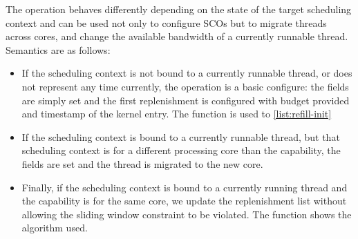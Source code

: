 The  operation behaves differently depending on the state of the target scheduling
context and can be used not only to configure \glspl{SCO} but to migrate threads across cores, and
change the available bandwidth of a currently runnable thread. Semantics are as follows:

\begin{itemize}
\item If the scheduling context is not bound
to a currently runnable thread, or does not represent any time currently, the operation is 
a basic configure: the fields are
simply set and the first replenishment is configured with budget provided and timestamp of the
kernel entry. The function  is used to \cref{list:refill-init}
\item If the scheduling context is bound to a currently runnable thread, but that scheduling
context is for a different processing core than the  capability, the fields are
set and the thread is migrated to the new core.  
\item Finally, if the scheduling context is bound to a currently running thread and the
     capability is for the same core, we update the replenishment list without
    allowing the sliding window constraint to be violated. The function  shows the
    algorithm used.
\end{itemize}

